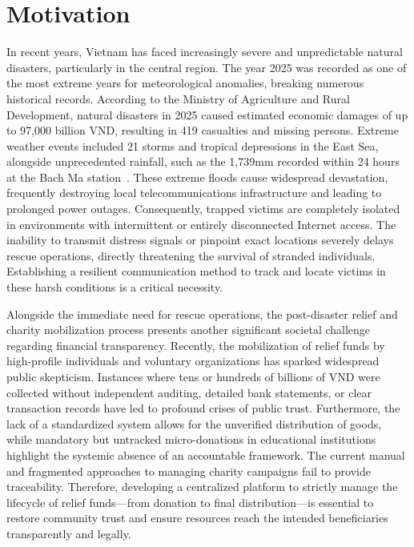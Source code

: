 \documentclass[../Main.tex]{subfiles}
\begin{document}
\section{Motivation}
\label{section:1.1}

In recent years, Vietnam has faced increasingly severe and unpredictable natural disasters, particularly in the central region. The year 2025 was recorded as one of the most extreme years for meteorological anomalies, breaking numerous historical records. According to the Ministry of Agriculture and Rural Development, natural disasters in 2025 caused estimated economic damages of up to 97,000 billion VND, resulting in 419 casualties and missing persons. Extreme weather events included 21 storms and tropical depressions in the East Sea, alongside unprecedented rainfall, such as the 1,739mm recorded within 24 hours at the Bach Ma station~\cite{vietnamnet2025thientai}. These extreme floods cause widespread devastation, frequently destroying local telecommunications infrastructure and leading to prolonged power outages. Consequently, trapped victims are completely isolated in environments with intermittent or entirely disconnected Internet access. The inability to transmit distress signals or pinpoint exact locations severely delays rescue operations, directly threatening the survival of stranded individuals. Establishing a resilient communication method to track and locate victims in these harsh conditions is a critical necessity.

Alongside the immediate need for rescue operations, the post-disaster relief and charity mobilization process presents another significant societal challenge regarding financial transparency. Recently, the mobilization of relief funds by high-profile individuals and voluntary organizations has sparked widespread public skepticism. Instances where tens or hundreds of billions of VND were collected without independent auditing, detailed bank statements, or clear transaction records have led to profound crises of public trust. Furthermore, the lack of a standardized system allows for the unverified distribution of goods, while mandatory but untracked micro-donations in educational institutions highlight the systemic absence of an accountable framework. The current manual and fragmented approaches to managing charity campaigns fail to provide traceability. Therefore, developing a centralized platform to strictly manage the lifecycle of relief funds—from donation to final distribution—is essential to restore community trust and ensure resources reach the intended beneficiaries transparently and legally.
\end{document}
